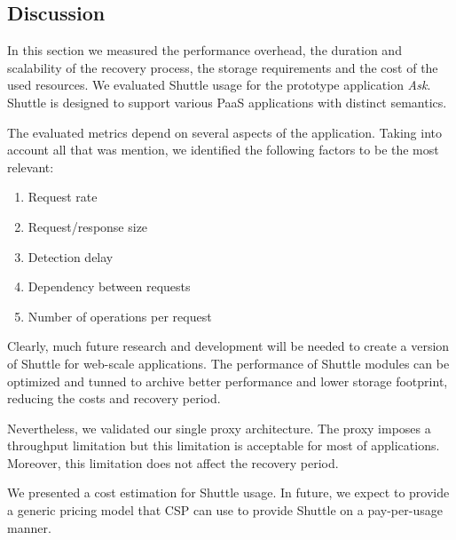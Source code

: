 \subsection{Discussion}\label{sec:eval:performance:discussion}
In this section we measured the performance overhead, the duration and scalability of the recovery process, the storage requirements and the cost of the used resources. We evaluated Shuttle usage for the prototype application \emph{Ask}. Shuttle is designed to support various \ac{PaaS} applications with distinct semantics.

The evaluated metrics depend on several aspects of the application. Taking into account all that was mention, we identified the following factors to be the most relevant:

\begin{enumerate}
  \item Request rate
  \item Request/response size
  \item Detection delay
  \item Dependency between requests   
  \item Number of operations per request
\end{enumerate}                              

Clearly, much future research and development will be needed to create a version of Shuttle for web-scale applications. The performance of Shuttle modules can be optimized and tunned to archive better performance and lower storage footprint, reducing the costs and recovery period.

Nevertheless, we validated our single proxy architecture. The proxy imposes a throughput limitation but this limitation is acceptable for most of applications. Moreover, this limitation does not affect the recovery period.

We presented a cost estimation for Shuttle usage. In future, we expect to provide a generic pricing model that \acf{CSP} can use to provide Shuttle on a pay-per-usage manner.


